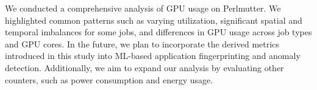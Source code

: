 We conducted a comprehensive analysis of GPU usage on Perlmutter. We
highlighted common patterns such as varying utilization, significant
spatial and temporal imbalances for some jobs, and differences in GPU
usage across job types and GPU cores. In the future, we plan to incorporate
the derived metrics introduced in this study into ML-based application
fingerprinting and anomaly detection. Additionally, we aim to
expand our analysis by evaluating other counters,
such as power consumption and energy usage.

